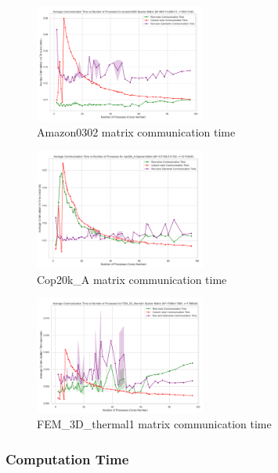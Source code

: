 \documentclass[12pt,oneside]{book} %
\begin{document}
\begin{figure}[H]
    \centering
    \includegraphics[width=0.5\textwidth]{../results/matrix_dim/amazon0302_k6_communication_time.png}
    \caption{Amazon0302 matrix communication time}\label{fig:amazon0302-k6-communication-time}
\end{figure}

\begin{figure}[H]
    \centering
    \includegraphics[width=0.5\textwidth]{../results/matrix_dim/cop20k_A_k6_communication_time.png}
    \caption{Cop20k\_A matrix communication time}\label{fig:cop20k-a-k6-communication-time-1}
\end{figure}

\begin{figure}[H]
    \centering
    \includegraphics[width=0.5\textwidth]{../results/matrix_dim/FEM_3D_thermal1_k6_communication_time.png}
    \caption{FEM\_3D\_thermal1 matrix communication time}\label{fig:fem-3d-thermal1-k6-communication-time}
\end{figure}

\subsubsection{Computation Time}
\end{document}
